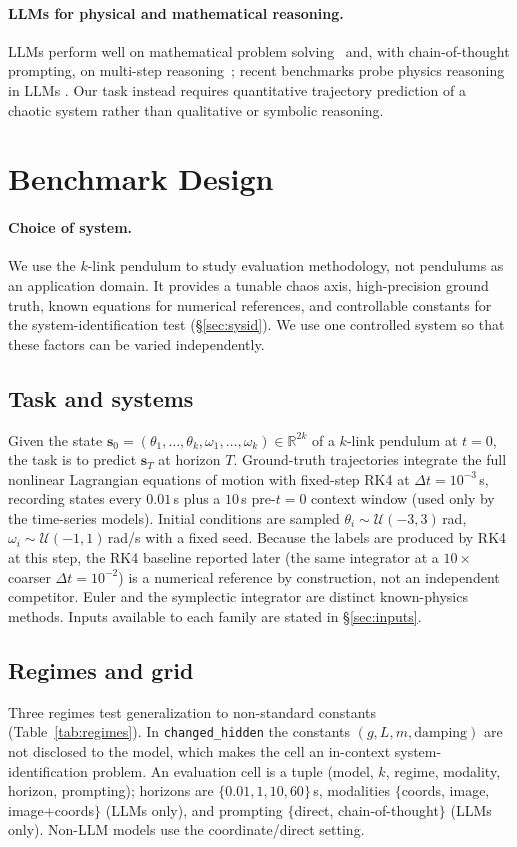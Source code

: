 \documentclass{article}
\begin{document}
\paragraph{LLMs for physical and mathematical reasoning.} LLMs perform well on mathematical
problem solving~\citep{lewkowycz2022minerva} and, with chain-of-thought prompting, on
multi-step reasoning~\citep{wei2022cot}; recent benchmarks probe physics reasoning in LLMs
\citep{xu2025ugphysics}. Our task instead requires quantitative trajectory prediction of a
chaotic system rather than qualitative or symbolic reasoning.

\section{Benchmark Design}
\paragraph{Choice of system.} We use the $k$-link pendulum to study evaluation methodology,
not pendulums as an application domain. It provides a tunable chaos axis, high-precision
ground truth, known equations for numerical references, and controllable constants for the
system-identification test (\S\ref{sec:sysid}). We use one controlled system so that these
factors can be varied independently.

\subsection{Task and systems}
Given the state $\mathbf{s}_0=(\theta_1,\dots,\theta_k,\omega_1,\dots,\omega_k)\in
\mathbb{R}^{2k}$ of a $k$-link pendulum at $t{=}0$, the task is to predict $\mathbf{s}_T$ at
horizon $T$. Ground-truth trajectories integrate the full nonlinear Lagrangian equations of
motion with fixed-step RK4 at $\Delta t{=}10^{-3}$\,s, recording states every $0.01$\,s plus
a $10$\,s pre-$t{=}0$ context window (used only by the time-series models). Initial
conditions are sampled $\theta_i\sim\mathcal{U}(-3,3)$\,rad,
$\omega_i\sim\mathcal{U}(-1,1)$\,rad/s with a fixed seed. Because the labels are produced by
RK4 at this step, the RK4 baseline reported later (the same integrator at a $10{\times}$
coarser $\Delta t{=}10^{-2}$) is a numerical reference by construction, not an independent
competitor. Euler and the symplectic integrator are distinct known-physics methods. Inputs
available to each family are stated in \S\ref{sec:inputs}.

\subsection{Regimes and grid}
Three regimes test generalization to non-standard constants (Table~\ref{tab:regimes}). In
\texttt{changed\_hidden} the constants $(g,L,m,\text{damping})$ are not disclosed to the
model, which makes the cell an in-context system-identification problem. An evaluation cell
is a tuple (model, $k$, regime, modality, horizon, prompting); horizons are
$\{0.01,1,10,60\}$\,s, modalities $\{$coords, image, image+coords$\}$ (LLMs only), and
prompting $\{$direct, chain-of-thought$\}$ (LLMs only). Non-LLM models use the
coordinate/direct setting.
\end{document}
